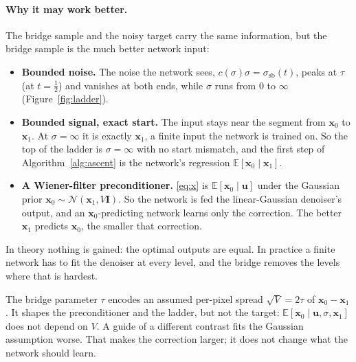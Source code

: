 \documentclass[11pt]{article}
\theoremstyle{remark}
\newcommand{\x}{\bm{x}}
\newcommand{\uu}{\bm{u}}
\newcommand{\E}{\mathbb{E}}
\newcommand{\N}{\mathcal{N}}
\newcommand{\Id}{\bm{I}}
\newcommand{\ssb}{\sigma_{\mathrm{sb}}}
\begin{document}
\paragraph{Why it may work better.} The bridge sample and the noisy target carry the same
information, but the bridge sample is the much better network input:
\begin{itemize}[leftmargin=1.5em, itemsep=1pt]
  \item \textbf{Bounded noise.} The noise the network sees, $c(\sigma)\sigma = \ssb(t)$, peaks
        at $\tau$ (at $t=\tfrac12$) and vanishes at both ends, while $\sigma$ runs from $0$ to
        $\infty$ (Figure~\ref{fig:ladder}).
  \item \textbf{Bounded signal, exact start.} The input stays near the segment from $\x_0$ to
        $\x_1$. At $\sigma=\infty$ it is exactly $\x_1$, a finite input the network is trained
        on. So the top of the ladder is $\sigma=\infty$ with no start mismatch, and the first
        step of Algorithm~\ref{alg:ascent} is the network's regression $\E[\x_0\mid\x_1]$.
  \item \textbf{A Wiener-filter preconditioner.} \eqref{eq:x} is $\E[\x_0\mid\uu]$ under the
        Gaussian prior $\x_0\sim\N(\x_1,V\Id)$. So the network is fed the linear-Gaussian
        denoiser's output, and an $\x_0$-predicting network learns only the correction. The
        better $\x_1$ predicts $\x_0$, the smaller that correction.
\end{itemize}
In theory nothing is gained: the optimal outputs are equal. In practice a finite network has to
fit the denoiser at every level, and the bridge removes the levels where that is hardest.

The bridge parameter $\tau$ encodes an assumed per-pixel spread $\sqrt V=2\tau$ of $\x_0-\x_1$.
It shapes the preconditioner and the ladder, but not the target: $\E[\x_0\mid\uu,\sigma,\x_1]$
does not depend on $V$. A guide of a different contrast fits the Gaussian assumption worse. That
makes the correction larger; it does not change what the network should learn.
\end{document}
